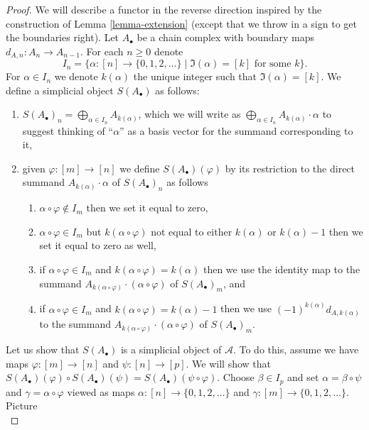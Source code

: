 \begin{proof}
We will describe a functor in the reverse direction
inspired by the construction of Lemma \ref{lemma-extension}
(except that we throw in a sign to get the boundaries
right). Let $A_\bullet$ be a chain complex with boundary maps
$d_{A, n} : A_n \to A_{n - 1}$. For each $n \geq 0$ denote
$$
I_n =
\Big\{
\alpha : [n] \to \{0, 1, 2, \ldots\}
\mid
\Im(\alpha) = [k]\text{ for some }k
\Big\}.
$$
For $\alpha \in I_n$ we denote $k(\alpha)$ the unique
integer such that $\Im(\alpha) = [k]$.
We define a simplicial object $S(A_\bullet)$ as follows:
\begin{enumerate}
\item $S(A_\bullet)_n = \bigoplus_{\alpha \in I_n} A_{k(\alpha)}$, which
we will write as
$\bigoplus_{\alpha \in I_n} A_{k(\alpha)} \cdot \alpha$
to suggest thinking of ``$\alpha$'' as a basis vector for the
summand corresponding to it,
\item given $\varphi : [m] \to [n]$ we define
$S(A_\bullet)(\varphi)$ by its restriction to
the direct summand $A_{k(\alpha)} \cdot \alpha$
of $S(A_\bullet)_n$ as follows
\begin{enumerate}
\item $\alpha \circ \varphi \not \in I_m$ then we set it equal to zero,
\item $\alpha \circ \varphi \in I_m$ but $k(\alpha \circ \varphi)$
not equal to either $k(\alpha)$ or $k(\alpha) - 1$ then we set it
equal to zero as well,
\item if $\alpha \circ \varphi \in I_m$
and $k(\alpha \circ \varphi) = k(\alpha)$ then we use
the identity map to the summand
$A_{k(\alpha \circ \varphi)} \cdot (\alpha \circ \varphi)$
of $S(A_\bullet)_m$, and
\item if $\alpha \circ \varphi \in I_m$
and $k(\alpha \circ \varphi) = k(\alpha) - 1$
then we use $(-1)^{k(\alpha)} d_{A, k(\alpha)}$ to the summand
$A_{k(\alpha \circ \varphi)}\cdot (\alpha \circ \varphi)$
of $S(A_\bullet)_m$.
\end{enumerate}
\end{enumerate}
Let us show that $S(A_\bullet)$ is a simplicial object of $\mathcal{A}$.
To do this, assume we have maps $\varphi : [m] \to [n]$ and
$\psi : [n] \to [p]$. We will show that
$S(A_\bullet)(\varphi) \circ S(A_\bullet)(\psi) =
S(A_\bullet)(\psi \circ \varphi)$. Choose $\beta \in I_p$ and set
$\alpha = \beta \circ \psi$ and $\gamma = \alpha \circ \varphi$
viewed as maps $\alpha : [n] \to \{0, 1, 2, \ldots\}$
and $\gamma : [m] \to \{0, 1, 2, \ldots\}$. Picture
$$
$$
\end{proof}
